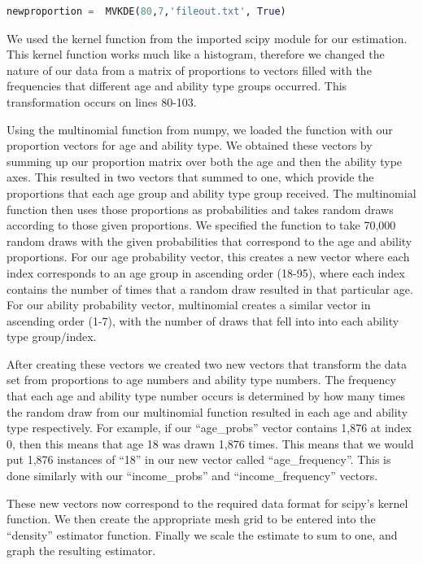 \documentclass[letterpaper,12pt]{article}
\newcommand{\quotes}[1]{``#1''}
\theoremstyle{definition}
\begin{document}
\begin{spacing}{1.5}
\begin{lstlisting}[language=Python, caption=MVKDE.py]
      newproportion =  MVKDE(80,7,'fileout.txt', True)
    \end{lstlisting}

    We used the kernel function from the imported scipy module for our estimation. This kernel function works much like a histogram, therefore we changed the nature of our data from a matrix of proportions to vectors filled with the frequencies that different age and ability type groups occurred. This transformation occurs on lines 80-103.

    Using the multinomial function from numpy, we loaded the function with our proportion vectors for age and ability type. We obtained these vectors by summing up our proportion matrix over both the age and then the ability type axes. This resulted in two vectors that summed to one, which provide the proportions that each age group and ability type group received. The multinomial function then uses those proportions as probabilities and takes random draws according to those given proportions. We specified the function to take 70,000 random draws with the given probabilities that correspond to the age and ability proportions. For our age probability vector, this creates a new vector where each index corresponds to an age group in ascending order (18-95), where each index contains the number of times that a random draw resulted in that particular age. For our ability probability vector, multinomial creates a similar vector in ascending order (1-7), with the number of draws that fell into into each ability type group/index.

    After creating these vectors we created two new vectors that transform the data set from proportions to age numbers and ability type numbers. The frequency that each age and ability type number occurs is determined by how many times the random draw from our multinomial function resulted in each age and ability type respectively. For example, if our \quotes{age\_probs} vector contains 1,876 at index 0, then this means that age 18 was drawn 1,876 times. This means that we would put 1,876 instances of \quotes{18} in our new vector called \quotes{age\_frequency}. This is done similarly with our \quotes{income\_probs} and \quotes{income\_frequency} vectors.

    These new vectors now correspond to the required data format for scipy's kernel function. We then create the appropriate mesh grid to be entered into the \quotes{density} estimator function. Finally we scale the estimate to sum to one, and graph the resulting estimator.



\end{spacing}
\end{document}

